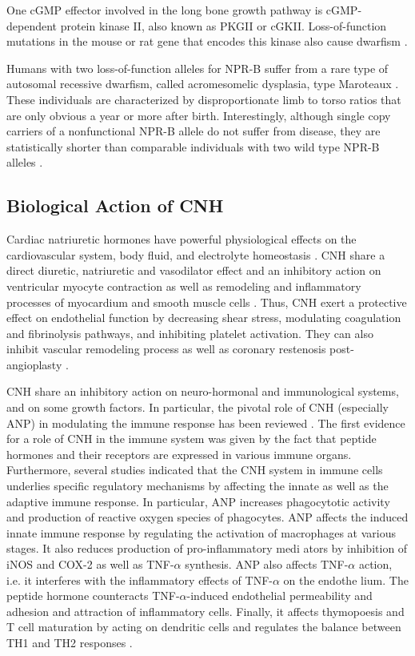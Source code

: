 \documentclass[14pt,a4paper,onecolumn]{extarticle}
\begin{document}
One cGMP effector involved in the long bone growth pathway is cGMP-dependent protein kinase II, also known as PKGII or cGKII. Loss-of-function mutations in the mouse or rat gene that encodes this kinase also cause dwarfism \citep{Chikuda2004}.

Humans with two loss-of-function alleles for NPR-B suffer from a rare type of autosomal recessive dwarfism, called acromesomelic dysplasia, type Maroteaux \citep{Bartels2004}. These individuals are characterized by disproportionate limb to torso ratios that are only obvious a year or more after birth. Interestingly, although single copy carriers of a nonfunctional NPR-B allele do not suffer from disease, they are statistically shorter than comparable individuals with two wild type NPR-B alleles \citep{Olney2006}.

\subsection{Biological Action of CNH }

Cardiac natriuretic hormones have powerful physiological effects on the cardiovascular system, body fluid, and electrolyte homeostasis \citep{13} \citep{28}. CNH share a direct diuretic, natriuretic and vasodilator effect and an inhibitory action on ventricular myocyte contraction \citep{79} as well as remodeling and inflammatory processes of myocardium and smooth muscle cells \citep{82} \citep{83}. Thus, CNH exert a protective effect on endothelial function by decreasing shear stress, modulating coagulation and fibrinolysis pathways, and inhibiting platelet activation. They can also inhibit vascular remodeling process as well as coronary restenosis post-angioplasty \citep{56} \citep{87} \citep{88} \citep{89}.

CNH share an inhibitory action on neuro-hormonal and immunological systems, and on some growth factors. In particular, the pivotal role of CNH (especially ANP) in modulating the immune response has been reviewed \citep{98}.
The first evidence for a role of CNH in the immune system was given by the fact that peptide hormones and their receptors are expressed in various immune organs. Furthermore, several studies indicated that the CNH system in immune cells underlies specific regulatory mechanisms by affecting the innate as well as the adaptive immune response. In particular, ANP increases phagocytotic activity and production of reactive oxygen species of phagocytes. ANP affects the induced innate immune response by regulating the activation of macrophages at various stages. It also reduces production of pro-inflammatory medi ators by inhibition of iNOS and COX-2 as well as TNF-$\alpha$ synthesis. ANP also affects TNF-$\alpha$ action, i.e. it interferes with the inflammatory effects of TNF-$\alpha$ on the endothe lium. The peptide hormone counteracts TNF-$\alpha$-induced endothelial permeability and adhesion and attraction of inflammatory cells. Finally, it affects thymopoesis and T cell maturation by acting on dendritic cells and regulates the balance between TH1 and TH2 responses \citep{99}.
\end{document}
